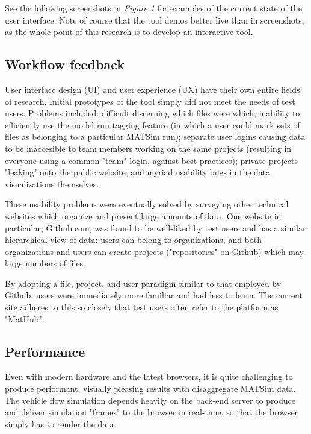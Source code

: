 \documentclass[Afour,sageh,times]{sagej}
\begin{document}
See the following screenshots in \textit{Figure 1} for examples of the current state of the user interface. Note of course that the tool demos better live than in screenshots, as the whole point of this research is to develop an interactive tool.


\subsection{Workflow feedback}

User interface design (UI) and user experience (UX) have their own entire fields of research. Initial prototypes of the tool simply did not meet the needs of test users. Problems included: difficult discerning which files were which; inability to efficiently use the model run tagging feature (in which a user could mark sets of files as belonging to a particular MATSim run); separate user logins causing data to be inaccesible to team members working on the same projects (resulting in everyone using a common "team" login, against best practices); private projects "leaking" onto the public website; and myriad usability bugs in the data visualizations themselves.

These usability problems were eventually solved by surveying other technical websites which organize and present large amounts of data. One website in particular, Github.com, was found to be well-liked by test users and has a similar hierarchical view of data: users can belong to organizations, and both organizations and users can create projects ("repositories" on Github) which may large numbers of files.

By adopting a file, project, and user paradigm similar to that employed by Github, users were immediately more familiar and had less to learn. The current site adheres to this so closely that test users often refer to the platform as "MatHub".

\subsection{Performance}

Even with modern hardware and the latest browsers, it is quite challenging to produce performant, visually pleasing results with disaggregate MATSim data. The vehicle flow simulation depends heavily on the back-end server to produce and deliver simulation "frames" to the browser in real-time, so that the browser simply has to render the data.
\end{document}

